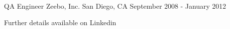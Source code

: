 \begin{cventries}
\cventry
{QA Engineer} %
{Zeebo, Inc.} %
{San Diego, CA} %
{September 2008 - January 2012} %
{}

\cventry
{} %
{Further details available on Linkedin} %
{} %
{} %
{}

\end{cventries}
